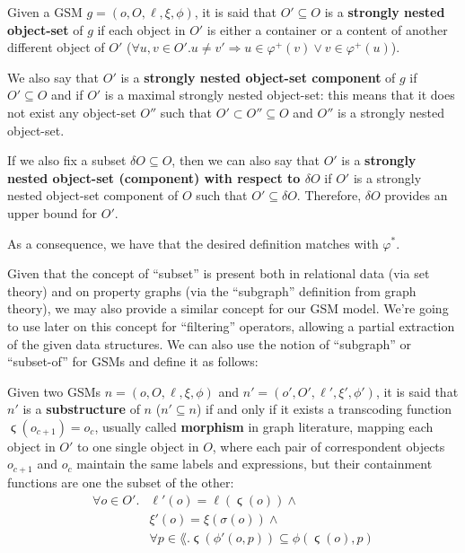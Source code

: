 \begin{definition}\label{def:stronglynestedobjectset}
Given a GSM $g=(o,O,\ell,\xi,\phi)$, it is said that $O'\subseteq O$ is a \textbf{strongly nested object-set} of $g$ if each object in $O'$ is either a container or a content of another different object of $O'$ ($\forall u,v\in O'. u\neq v'\Rightarrow u\in\varphi^+(v)\vee v\in\varphi^+(u)$). \medskip

We also say that $O'$ is a \textbf{strongly nested object-set component} of $g$ if $O'\subseteq O$ and if $O'$ is a maximal strongly nested object-set: this means that it does not exist any object-set $O''$ such that $O'\subset O''\subseteq O$ and $O''$ is a strongly nested object-set. \medskip

If we also fix a subset $\delta O\subseteq O$, then we can also say that $O'$ is a \textbf{strongly nested object-set (component) with respect to $\delta O$} if $O'$ is a strongly nested object-set component of $O$ such that $O'\subseteq \delta O$. Therefore, $\delta O$ provides an upper bound for $O'$.
\end{definition}

As a consequence, we have that the desired definition matches with $\varphi^*$. 

Given that the concept of ``subset'' is present both in relational data (via set theory) and on property graphs (via the ``subgraph'' definition from graph theory), we may also provide a similar concept for our GSM model. We're going to use later on this concept for ``filtering'' operators, allowing a partial extraction of the given data structures. We can also use the notion of ``subgraph'' or ``subset-of'' for GSMs and define it as follows:
\begin{definition}[Substructure]
Given two GSMs $n=(o,O,\ell,\xi,\phi)$ and $n'=(o',O',\ell',\xi',\phi')$, it is said that $n'$ is a \textbf{substructure} of $n$ ($n'\subseteq n$) if and only if it
 exists a transcoding function $\stigma(o_{c+1})=o_c$, usually called \textbf{morphism} in graph literature, mapping each object in $O'$ to one single object in $O$, where each pair of correspondent objects $o_{c+1}$ and $o_c$ maintain the same labels and expressions, but their containment functions are one the subset of the other:
\[\begin{split}
\forall o\in O'. &\ell'(o) = \ell(\stigma(o))\wedge\\
&\xi'(o) = \xi(\sigma(o))\wedge\\
&\forall p\in\lang. \stigma(\phi'(o,p))\subseteq \phi(\stigma(o),p)\\
\end{split}\]
\end{definition}

